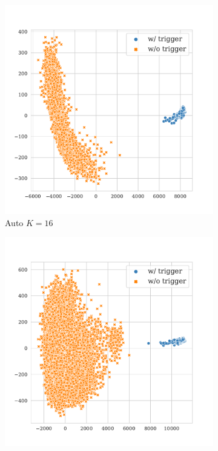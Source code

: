 \begin{figure}[!ht]
\begin{subfigure}{.33\textwidth}
  \centering
  \includegraphics[width=\linewidth]{figures/evaluation_media/enron-spam-roberta-large-visual-backdoor-auto-k16-seed42-poison-cf-107.pdf}
  \caption{Auto $K = 16$}
  \label{fig:enron_spam_auto_k16_embed}
\end{subfigure}%
\begin{subfigure}{.33\textwidth}
  \centering
  \includegraphics[width=\linewidth]{figures/evaluation_media/enron-spam-roberta-large-visual-backdoor-auto-k100-seed42-poison-cf-114.pdf}

\end{subfigure}
\end{figure}
